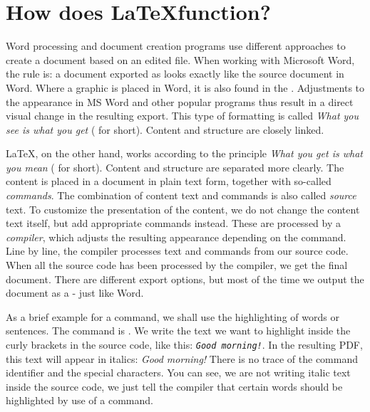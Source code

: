 \chapter{How does \LaTeX function?}
\label{sec:basic-functionality}

Word processing and document creation programs use different approaches to create a document based on an edited file.
When working with Microsoft Word, the rule is: a document exported as  looks exactly like the source document in Word. Where a graphic is placed in Word, it is also found in the . Adjustments to the appearance in MS Word and other popular programs thus result in a direct visual change in the resulting export. This type of formatting is called \emph{What you see is what you get} ( for short). Content and structure are closely linked.

\LaTeX{}, on the other hand, works according to the principle \emph{What you get is what you mean} ( for short). Content and structure are separated more clearly.
The content is placed in a document in plain text form, together with so-called \emph{commands}. The combination of content text and commands is also called \emph{source} text. To customize the presentation of the content, we do not change the content text itself, but add appropriate commands instead. These are processed by a \emph{compiler}, which adjusts the resulting appearance depending on the command. Line by line, the compiler processes text and commands from our source code. When all the source code has been processed by the compiler, we get the final document. There are different export options, but most of the time we output the document as a  - just like Word.


As a brief example for a command, we shall use the highlighting of words or sentences. The command is \texttt{\emph{}}. We write the text we want to highlight inside the curly brackets in the source code, like this: \texttt{\emph{Good morning!}}. In the resulting PDF, this text will appear in italics: \emph{Good morning!} There is no trace of the command identifier and the special characters. You can see, we are not writing italic text inside the source code, we just tell the compiler that certain words should be highlighted by use of a command.

